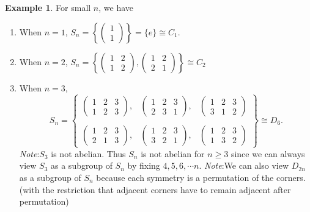 \documentclass[a4paper]{article}
\theoremstyle{definition}
\newtheorem*{eg}{Example}
\newcommand{\note}{\noindent \emph{Note}:\;}
\begin{document}
\begin{eg}
  For small $n$, we have
  \begin{enumerate}
  \item When $n = 1$, $S_n = \left\{\begin{pmatrix}1\\1\end{pmatrix}\right\} = \{e\}\cong C_1$.
  \item When $n = 2$, $S_n = \left\{\begin{pmatrix}1 & 2\\ 1 & 2\end{pmatrix}, \begin{pmatrix}1 & 2\\2 & 1\end{pmatrix}\right\}\cong C_2$
  \item When $n = 3$,
    \[
    S_n = \left\{\begin{matrix}\begin{pmatrix}1 & 2 & 3\\1 & 2 & 3\end{pmatrix}, &\begin{pmatrix}1 & 2 & 3\\ 2 & 3 & 1\end{pmatrix}, &\begin{pmatrix}1 & 2 & 3\\3 & 1 & 2\end{pmatrix}\\\\\begin{pmatrix}1 & 2 & 3\\2 & 1 & 3\end{pmatrix}, &\begin{pmatrix}1 & 2 & 3\\ 3 & 2 & 1\end{pmatrix}, &\begin{pmatrix}1 & 2 & 3\\1 & 3 & 2\end{pmatrix}\end{matrix}\right\}\cong D_6.
    \]
  \note $S_3$ is not abelian. Thus $S_n$ is not abelian for $n \geq 3$ since we can always view $S_3$ as a subgroup of $S_n$ by fixing $4, 5, 6, \cdots n$.
  \note We can also view $D_{2n}$ as a subgroup of $S_n$ because each symmetry is a permutation of the corners. (with the restriction that adjacent corners have to remain adjacent after permutation)
  \end{enumerate}
\end{eg}
\end{document}
